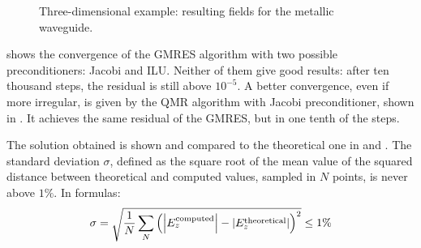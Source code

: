 \begin{figure}[htbp]
  \begin{center}
  \end{center}
  \caption{Three-dimensional example: resulting fields for the metallic waveguide.}
  \label{fig:simple_waveguide_section}
\end{figure}

 shows the convergence of the GMRES
algorithm with two possible preconditioners: Jacobi and ILU. Neither
of them give good results: after ten thousand steps, the residual is
still above $10^{-5}$. A better convergence, even if more irregular,
is given by the QMR algorithm with Jacobi preconditioner, shown in
. It achieves the same residual of
the GMRES, but in one tenth of the steps.

The solution obtained is shown and compared to the theoretical one in
 and
. The standard deviation $\sigma$,
defined as the square root of the mean value of the squared distance
between theoretical and computed values, sampled in $N$ points, is
never above $1\%$. In formulas:
\begin{equation} \label{eqn:standard_deviation}
  \sigma = \sqrt{\frac{1}{N} \sum_N\left({\left\lvert E_z^{\text{computed}}\right\rvert} -
  {\left\lvert E_z^{\text{theoretical}}\right\rvert}\right)^2} \leq 1\%
\end{equation}

